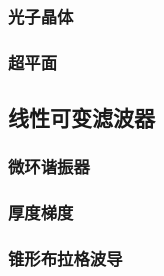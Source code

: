 \documentclass[9 pt,makeindex]{beamer}
\begin{document}
\subsubsection{光子晶体}

\subsubsection{超平面}


\subsection{线性可变滤波器}
\subsubsection{微环谐振器}

\subsubsection{厚度梯度}

\subsubsection{锥形布拉格波导}




\end{document}
